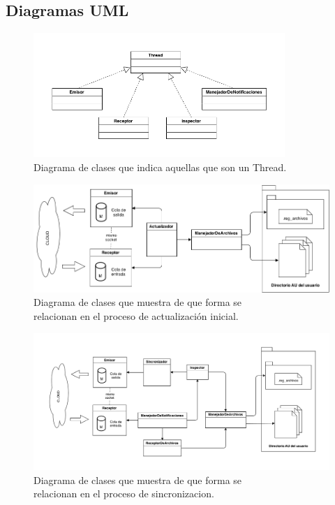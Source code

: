\documentclass{article}
\begin{document}
\subsection{Diagramas UML}


\begin{figure}[h]
	\centering
	\includegraphics[width=0.85\textwidth]{images/Diagrama-modelo-cliente-threads.png}
	\caption{Diagrama de clases que indica aquellas que son un Thread.}
\end{figure}
\bigskip


\begin{figure}[h]
	\centering
	\includegraphics[width=1.0\textwidth]{images/Diagrama-modelo-cliente-actualizacion.png}
	\medskip
	\caption{Diagrama de clases que muestra de que forma se \\ relacionan en el proceso de actualización inicial.}
\end{figure}
\bigskip


\begin{figure}[h]
	\centering
	\includegraphics[width=1.0\textwidth]{images/Diagrama-modelo-cliente.png}
	\caption{Diagrama de clases que muestra de que forma se \\ relacionan en el proceso de sincronizacion.}
\end{figure}
\bigskip
\end{document}
